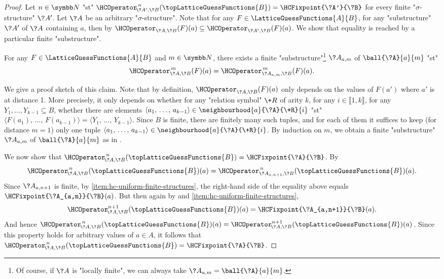 \begin{proof}
	Let $n\in \N$ "st" $\HCOperator^{\,n}_{\!\?A',\?B}(\topLatticeGuessFunctions{B}) = \HCFixpoint{\?A'}{\?B}$ for every finite "$\sigma$-structure" $\?A'$. Let $\?A$ be an arbitrary
	"$\sigma$-structure". Note that for any $F\in \LatticeGuessFunctions{A}{B}$, for any 
	"substructure" $\?A'$ of $\?A$ containing $a$, then by 
	$\HCOperator_{\?A,\?B}(F)(a) \subseteq \HCOperator_{\?A',\?B}(F)(a)$.
	We show that equality is reached by a particular finite "substructure".
	\begin{claim}
		\label{claim:hyperedge-consistency-ball}
		For any $F\in \LatticeGuessFunctions{A}{B}$ and $m\in \N$,
		there exists a finite "substructure"\footnote{Of course, if $\?A$ is "locally finite",
		we can always take $\?A_{a,m} = \ball{\?A}{a}{m}$.}
		$\?A_{a,m}$ of $\ball{\?A}{a}{m}$ "st"
		\[\HCOperator^{\,m}_{\?A,\?B}(F)(a) = \HCOperator^{\,m}_{\?A_{a,m},\?B}(F)(a).\]
	\end{claim}
	We give a proof sketch of this claim. Note that by definition,
	$\HCOperator_{\?A,\?B}(F)(a)$ only depends on the values of $F(a')$ where $a'$ is at distance 1.
	More precisely, it only depends on whether for any "relation symbol" $\+R$ of arity $k$,
	for any $i\in\lBrack 1,k\rBrack$, for any $Y_1,\hdots,Y_{k-1} \subseteq B$, whether there
	are elements $\langle a_1,\,\hdots,\,a_{k-1}\rangle \in \neighbourhood{a}{\?A}{\+R}{i}$
	"st"  
	$\langle F(a_1),\,\hdots,\,F(a_{k-1}) \rangle = \langle Y_1,\,\hdots,\,Y_{k-1} \rangle$.
	Since $B$ is finite, there are finitely many such tuples, and for each of them it suffices
	to keep (for distance $m=1$) only one tuple $\langle a_1,\,\hdots,\,a_{k-1}\rangle \in \neighbourhood{a}{\?A}{\+R}{i}$. By induction on $m$, we
	obtain a finite "substructure" $\?A_{a,m}$ of $\ball{\?A}{a}{m}$ as in
	.

	We now show that $\HCOperator^{\,n}_{\!\?A,\?B}(\topLatticeGuessFunctions{B}) =
	\HCFixpoint{\?A}{\?B}$. By 
	\[\HCOperator^{\,n}_{\!\?A,\?B}(\topLatticeGuessFunctions{B})(a) =
	\HCOperator^{\,n}_{\?A_{a,n+1},\?B}(\topLatticeGuessFunctions{B})(a).\]
	Since $\?A_{a,n+1}$ is finite, by \eqref{item:hc-uniform-finite-structures}, the right-hand side
	of the equality above equals $\HCFixpoint{\?A_{a,m}}{\?B}(a)$.
	But then again by  and \eqref{item:hc-uniform-finite-structures}, 
	\[\HCOperator^{n+1}_{\!\?A,\?B}(\topLatticeGuessFunctions{B})(a) = \HCFixpoint{\?A_{a,n+1}}{\?B}(a).\]
	And hence $\HCOperator^{\,n}_{\!\?A,\?B}(\topLatticeGuessFunctions{B})(a) = \HCOperator^{n+1}_{\!\?A,\?B}(\topLatticeGuessFunctions{B})(a)$. Since this property holds
	for arbitrary values of $a\in A$, it follows that $\HCOperator^{\,n}_{\!\?A,\?B}(\topLatticeGuessFunctions{B}) = \HCFixpoint{\?A}{\?B}$. 


\end{proof}

